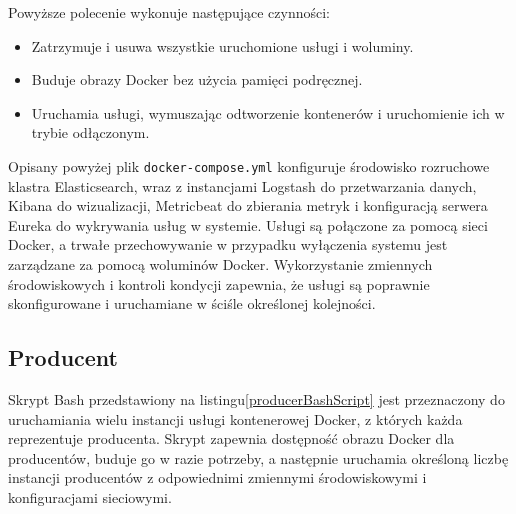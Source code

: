 Powyższe polecenie wykonuje następujące czynności:

\begin{itemize}
    \item Zatrzymuje i usuwa wszystkie uruchomione usługi i woluminy.
    \item Buduje obrazy Docker bez użycia pamięci podręcznej.
    \item Uruchamia usługi, wymuszając odtworzenie kontenerów i uruchomienie ich w trybie odłączonym.
\end{itemize}

Opisany powyżej plik \verb|docker-compose.yml| konfiguruje środowisko rozruchowe klastra Elasticsearch, wraz z instancjami Logstash do przetwarzania danych, Kibana do wizualizacji, Metricbeat do zbierania metryk i konfiguracją serwera Eureka do wykrywania usług w systemie. Usługi są połączone za pomocą sieci Docker, a trwałe przechowywanie w przypadku wyłączenia systemu jest zarządzane za pomocą woluminów Docker. Wykorzystanie zmiennych środowiskowych i kontroli kondycji zapewnia, że usługi są poprawnie skonfigurowane i uruchamiane w ściśle określonej kolejności.

\subsection{Producent}

Skrypt Bash przedstawiony na listingu\ref{producerBashScript} jest przeznaczony do uruchamiania wielu instancji usługi kontenerowej Docker, z których każda reprezentuje producenta. Skrypt zapewnia dostępność obrazu Docker dla producentów, buduje go w razie potrzeby, a następnie uruchamia określoną liczbę instancji producentów z odpowiednimi zmiennymi środowiskowymi i konfiguracjami sieciowymi.

